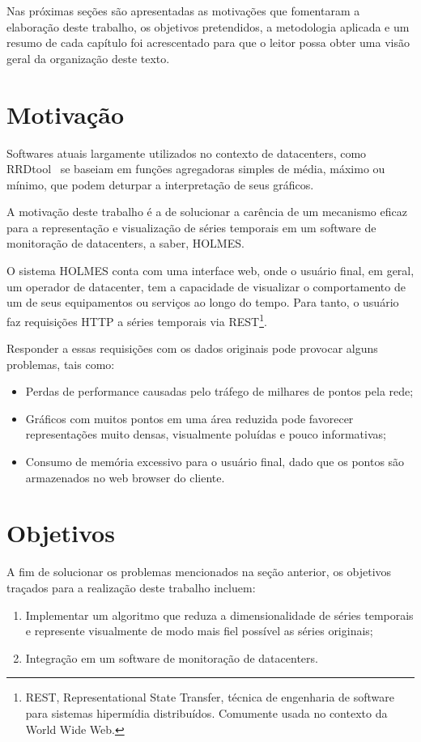 Nas próximas seções são apresentadas as motivações que fomentaram a elaboração deste trabalho, os objetivos pretendidos, a metodologia aplicada e um resumo de cada capítulo foi acrescentado para que o leitor possa obter uma visão geral da organização deste texto.


\section{Motivação}
\label{sec:motivacao}
Softwares atuais largamente utilizados no contexto de datacenters, como RRDtool~\cite{rrdtool} se baseiam em funções agregadoras simples de média, máximo ou mínimo, que podem deturpar a interpretação de seus gráficos.

A motivação deste trabalho é a de solucionar a carência de um mecanismo eficaz para a representação e visualização de séries temporais em um software de monitoração de datacenters, a saber, HOLMES.

O sistema HOLMES conta com uma interface web, onde o usuário final, em geral, um operador de datacenter, tem a capacidade de visualizar o comportamento de um de seus equipamentos ou serviços ao longo do tempo. Para tanto, o usuário faz requisições HTTP a séries temporais via REST\footnote{REST, Representational State Transfer, técnica de engenharia de software para sistemas hipermídia distribuídos. Comumente usada no contexto da World Wide Web.}.

Responder a essas requisições com os dados originais pode provocar alguns problemas, tais como:

\begin{itemize}
\item Perdas de performance causadas pelo tráfego de milhares de pontos pela rede;
\item Gráficos com muitos pontos em uma área reduzida pode favorecer representações muito densas, visualmente poluídas e pouco informativas;
\item Consumo de memória excessivo para o usuário final, dado que os pontos são armazenados no web browser do cliente.
\end{itemize}

\section{Objetivos}
\label{sec:objetivos}
A fim de solucionar os problemas mencionados na seção anterior, os objetivos traçados para a realização deste trabalho incluem:
\begin{enumerate}
  \item Implementar um algoritmo que reduza a dimensionalidade de séries temporais e represente visualmente de modo mais fiel possível as séries originais;
  \item Integração em um software de monitoração de datacenters.
\end{enumerate}

